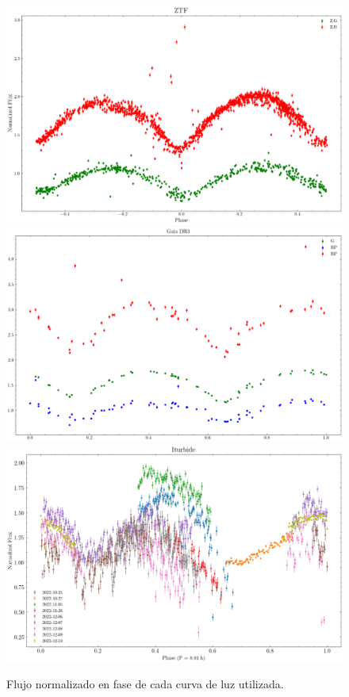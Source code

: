 \begin{figure}[!ht]
	\centering
	\includegraphics[scale=0.3]{Metodologia/Secciones/NormalizacionFlujos/Figures/ZTF Normalized Flux.png}
	\includegraphics[scale=0.31]{Metodologia/Secciones/NormalizacionFlujos/Figures/GDR3 Normalized Flux.png}
	\includegraphics[scale=0.4]{Metodologia/Secciones/NormalizacionFlujos/Figures/Iturbide Normalized Flux.png}

	\caption{Flujo normalizado en fase de cada curva de luz utilizada. }
	\label{normFlujosCurvas}
\end{figure}